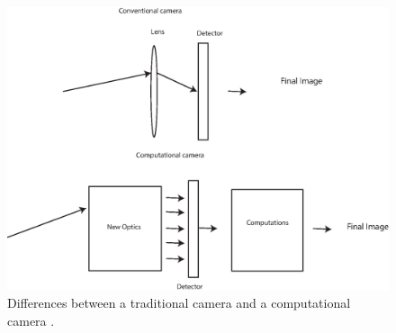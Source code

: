 \begin{figure}[H]
	\centering
	\includegraphics[width=.7\textwidth]{systems.eps}
	\caption{\label{fig:systems}Differences between a traditional camera and a computational camera \cite{nayar2006computational}.}
\end{figure}

